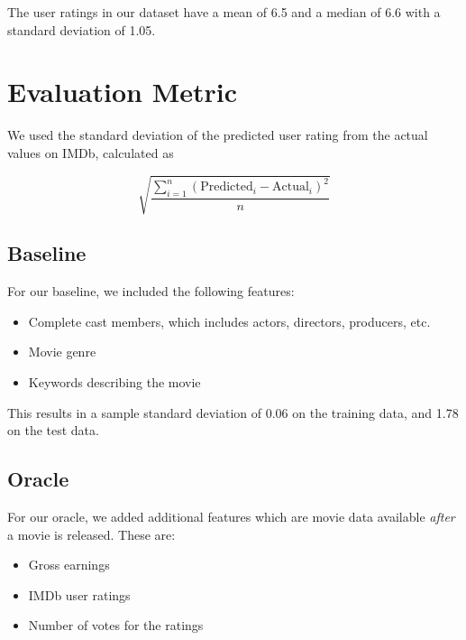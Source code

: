 \documentclass[journal]{IEEEtran}
\begin{document}

The user ratings in our dataset have a mean of 6.5 and a median of 6.6 with a standard deviation of 1.05.

\section{Evaluation Metric}
We used the standard deviation of the predicted user rating from the actual values on IMDb, calculated as

$$ \sqrt{\frac{\sum_{i=1}^n(\text{Predicted}_i-\text{Actual}_i)^2}{n}} $$

\subsection{Baseline}
For our baseline, we included the following features:
\begin{itemize}
	\item Complete cast members, which includes actors, directors, producers, etc.
	\item Movie genre
	\item Keywords describing the movie
\end{itemize}

This results in a sample standard deviation of 0.06 on the training data, and
1.78 on the test data.

\subsection{Oracle}
For our oracle, we added additional features which are movie data available
\emph{after} a movie is released. These are:
\begin{itemize}
	\item Gross earnings
	\item IMDb user ratings
	\item Number of votes for the ratings
\end{itemize}
\end{document}
